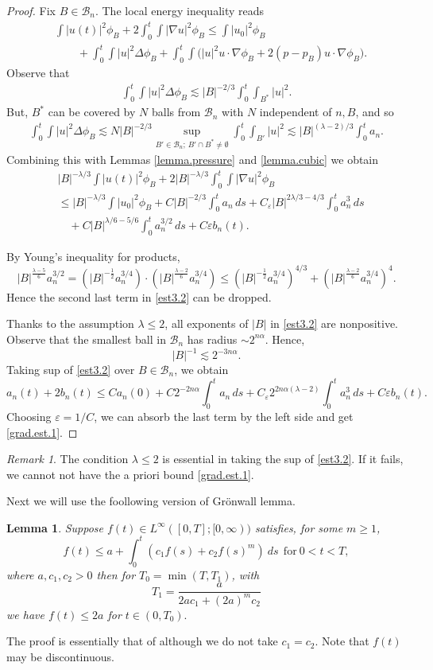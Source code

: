 \documentclass[11pt]{article}
\numberwithin{equation}{section}
\newtheorem{lem}[thm]{Lemma}
\theoremstyle{remark}
\newtheorem{remark}[thm]{Remark}
\theoremstyle{definition}
\newcommand{\cB}{\mathcal{B}}
\newcommand{\nb}{\nabla}
\newcommand\al{\alpha}
\newcommand\e {\varepsilon}  %
\newcommand\la{\lambda}
\newcommand{\EQ}[1]{\begin{equation} #1 \end{equation}}
\newcommand{\EQS}[1]{\begin{equation}\begin{split} #1 \end{split}\end{equation}}
\newcommand{\EQN}[1]{\begin{equation*}\begin{split} #1 \end{split}\end{equation*}}
\begin{document}
\begin{proof}
Fix $B\in \mathcal B_n$. The local energy inequality reads
\EQN{
&\int |u(t)|^2 \phi_B + 2\int_0^t \int |\nb u|^2 \phi_B \leq  \int |u_0|^2\phi_B
\\&\qquad + \int_0^t\!\int |u|^2 \Delta \phi_B  + \int_0^t\! \int \big( |u|^2 u\cdot \nb \phi_B + 2(p-p_B) u\cdot \nb \phi_B   \big).
}
Observe that
\EQN{
 \int_0^t \int |u|^2\Delta \phi_B\lesssim |B|^{-2/3} \int_0^t \int_{B^*} |u|^2.
}
But, $B^*$ can be covered by $N$ balls from $\mathcal B_n$ with $N$ independent of $n,B$, and so
\EQN{
 \int_0^t \int |u|^2\Delta \phi_B\lesssim N |B|^{-2/3} \sup_{B'\in \mathcal B_n; \,B' \cap B^*\not= \emptyset}  \int_0^t \int_{B'} |u|^2 \lesssim |B|^{(\la-2)/3} \int_0^t a_n.
}
Combining this with Lemmas \ref{lemma.pressure} and \ref{lemma.cubic} we obtain
\EQS{\label{est3.2}
& |B|^{-\la/3} \int |u(t)|^2 \phi_B + 2 |B|^{-\la/3}\int_0^t \int |\nb u|^2 \phi_B
 \\
&\leq |B|^{-\la/3}  \int |u_0|^2\phi_B +C|B|^{-2/3} \int_0^t a_n\,ds
+  C_\e |B|^{2\la/3-4/3 }\int_0^t a_n^3 \,ds
\\&\quad +C |B|^{\la/6- 5/6 }\int_0^t a_n^{3/2}\,ds + C \e b_n(t).
}

By Young's inequality for products,
\EQ{
|B|^{\frac{\la-5}6 } a_n^{3/2}  =  (|B|^{-\frac12 } a_n^{3/4})\cdot (|B|^{\frac{\la-2}6 } a_n^{3/4}) \le
(|B|^{-\frac12 } a_n^{3/4})^{4/3}+ (|B|^{\frac{\la-2}6 } a_n^{3/4})^4.
}
Hence the second last term in  \eqref{est3.2} can be dropped.

Thanks to the assumption $\la \le 2$, all exponents of $|B|$ in \eqref{est3.2} are nonpositive.
Observe that the smallest ball in $\mathcal B_n$ has radius $\sim 2^{n\al}$. Hence,
\[
|B|^{-1}\lesssim 2^{-3n\al}.
\]
 Taking sup of
\eqref{est3.2} over $B \in \cB_n$, we obtain
\[
a_n(t)+2b_n(t)
\leq Ca_n(0) +C2^{-2n\al} \int_0^t a_n\,ds
+  C_\e 2^{2n\al(\la-2)}\int_0^t a_n^3 \,ds + C \e b_n(t).
\]
Choosing $\e=1/C$, we can absorb the last term by the left side and get \eqref{grad.est.1}.
\end{proof}

\begin{remark}\label{la<2}
The condition $\la \le 2$ is essential in taking the sup of \eqref{est3.2}. If it fails, we cannot not have the a priori bound \eqref{grad.est.1}.
\end{remark}
\smallskip
Next we will use the foollowing version of Gr\"onwall lemma.
%
\begin{lem}\label{Gronwall}
  Suppose $f(t)\in L^{\infty}([0,T];[0,\infty))$ satisfies, for some $m\ge 1$,
  \EQ{
  f(t)\le a+\int_{0}^{t}(c_1f(s)+c_2f(s)^m)~ds~~\text{for}~ 0<t<T,
  }
  where $a,c_1,c_2>0$ then for $T_0=\min(T,T_1)$, with
  $$
  T_1=\frac{a}{2ac_1+(2a)^mc_2}
  $$
  we have $f(t)\le 2a$ for $t\in(0,T_0).$
\end{lem}
The proof is essentially that of \cite[Lemma 2.2]{BT8} although we do not take $c_1=c_2$. Note that $f(t)$ may be discontinuous.
\end{document}
